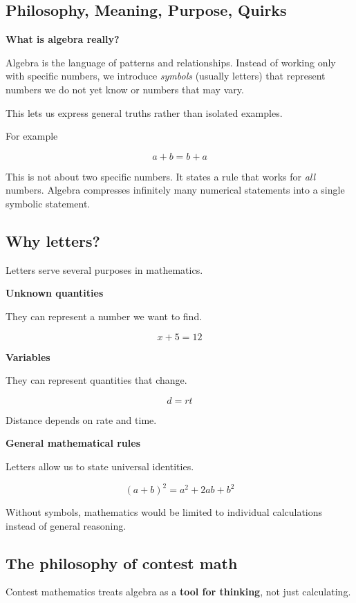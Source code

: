 \documentclass[11pt]{article}
\begin{document}
\begin{bluebox}

\section{Philosophy, Meaning, Purpose, Quirks}

\textbf{What is algebra really?}

Algebra is the language of patterns and relationships. Instead of working only with specific numbers, we introduce \emph{symbols} (usually letters) that represent numbers we do not yet know or numbers that may vary.

This lets us express general truths rather than isolated examples.

For example

\[
a+b=b+a
\]

This is not about two specific numbers. It states a rule that works for \emph{all} numbers. Algebra compresses infinitely many numerical statements into a single symbolic statement.

\subsection*{Why letters?}

Letters serve several purposes in mathematics.

\textbf{Unknown quantities}

They can represent a number we want to find.

\[
x+5=12
\]

\textbf{Variables}

They can represent quantities that change.

\[
d = rt
\]

Distance depends on rate and time.

\textbf{General mathematical rules}

Letters allow us to state universal identities.

\[
(a+b)^2 = a^2 + 2ab + b^2
\]

Without symbols, mathematics would be limited to individual calculations instead of general reasoning.

\subsection*{The philosophy of contest math}

Contest mathematics treats algebra as a \textbf{tool for thinking}, not just calculating.


\end{bluebox}
\end{document}
